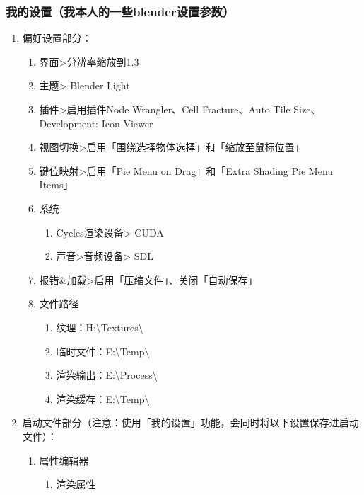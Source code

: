 \documentclass{../../PublicResources/DocClass}
\begin{document}
\newpage
\subsubsection{我的设置（我本人的一些blender设置参数）}
\hypertarget{MySettings}{}
\begin{enumerate}
    \item 偏好设置部分：
          \begin{enumerate}
              \item 界面>分辨率缩放到1.3
              \item 主题> Blender Light
              \item 插件>启用插件Node Wrangler、Cell Fracture、Auto Tile Size、Development: Icon Viewer
              \item 视图切换>启用「围绕选择物体选择」和「缩放至鼠标位置」
              \item 键位映射>启用「Pie Menu on Drag」和「Extra Shading Pie Menu Items」
              \item 系统
                    \begin{enumerate}
                        \item Cycles渲染设备> CUDA
                        \item 声音>音频设备> SDL
                    \end{enumerate}
              \item 报错\&加载>启用「压缩文件」、关闭「自动保存」
              \item 文件路径
                    \begin{enumerate}
                        \item 纹理：H:\textbackslash Textures\textbackslash
                        \item 临时文件：E:\textbackslash Temp\textbackslash
                        \item 渲染输出：E:\textbackslash Process\textbackslash
                        \item 渲染缓存：E:\textbackslash Temp\textbackslash
                    \end{enumerate}
          \end{enumerate}
    \item 启动文件部分（注意：使用「我的设置」功能，会同时将以下设置保存进启动文件）：
          \begin{enumerate}
              \item 属性编辑器
                    \begin{enumerate}
                        \item 渲染属性

\end{enumerate}
\end{enumerate}
\end{enumerate}
\end{document}
